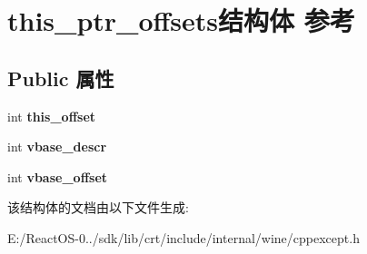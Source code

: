 \hypertarget{structthis__ptr__offsets}{}\section{this\+\_\+ptr\+\_\+offsets结构体 参考}
\label{structthis__ptr__offsets}
\subsection*{Public 属性}
\begin{DoxyCompactItemize}
\item 
\mbox{\label{structthis__ptr__offsets_a1bc97b873d6e2eea407e1326cfa59465}} 
int {\bfseries this\+\_\+offset}
\item 
\mbox{\label{structthis__ptr__offsets_aefd0e305c44d7447a3384c298338eda3}} 
int {\bfseries vbase\+\_\+descr}
\item 
\mbox{\label{structthis__ptr__offsets_a20bf845a4bd6ab91f1e293cd49d05639}} 
int {\bfseries vbase\+\_\+offset}
\end{DoxyCompactItemize}


该结构体的文档由以下文件生成\+:\begin{DoxyCompactItemize}
\item 
E\+:/\+React\+O\+S-\/0../sdk/lib/crt/include/internal/wine/cppexcept.\+h\end{DoxyCompactItemize}
